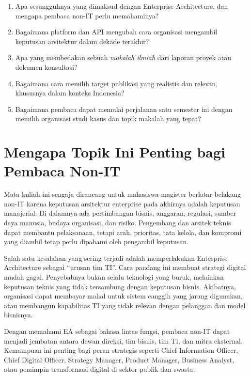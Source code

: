 \begin{enumerate}
  \item Apa sesungguhnya yang dimaksud dengan Enterprise Architecture, dan
        mengapa pembaca non-IT perlu memahaminya?
  \item Bagaimana platform dan API mengubah cara organisasi mengambil keputusan
        arsitektur dalam dekade terakhir?
  \item Apa yang membedakan sebuah \emph{makalah ilmiah} dari laporan proyek
        atau dokumen konsultasi?
  \item Bagaimana cara memilih target publikasi yang realistis dan relevan,
        khususnya dalam konteks Indonesia?
  \item Bagaimana pembaca dapat memulai perjalanan satu semester ini dengan
        memilih organisasi studi kasus dan topik makalah yang tepat?
\end{enumerate}

\section{Mengapa Topik Ini Penting bagi Pembaca Non-IT}

Mata kuliah ini sengaja dirancang untuk mahasiswa magister berlatar belakang
non-IT karena keputusan arsitektur enterprise pada akhirnya adalah keputusan
manajerial. Di dalamnya ada pertimbangan bisnis, anggaran, regulasi, sumber
daya manusia, budaya organisasi, dan risiko. Pengembang dan arsitek teknis
dapat membantu pelaksanaan, tetapi arah, prioritas, tata kelola, dan kompromi
yang diambil tetap perlu dipahami oleh pengambil keputusan.

Salah satu kesalahan yang sering terjadi adalah memperlakukan Enterprise
Architecture sebagai ``urusan tim TI''. Cara pandang ini membuat strategi
digital mudah gagal. Penyebabnya bukan selalu teknologi yang buruk, melainkan
keputusan teknis yang tidak tersambung dengan keputusan bisnis. Akibatnya,
organisasi dapat membayar mahal untuk sistem canggih yang jarang digunakan,
atau membangun kapabilitas TI yang tidak relevan dengan pelanggan dan model
bisnisnya.

Dengan memahami EA sebagai bahasa lintas fungsi, pembaca non-IT dapat menjadi
jembatan antara dewan direksi, tim bisnis, tim TI, dan mitra eksternal.
Kemampuan ini penting bagi peran strategis seperti Chief Information Officer,
Chief Digital Officer, Strategy Manager, Product Manager, Business Analyst,
atau pemimpin transformasi digital di sektor publik dan swasta.

